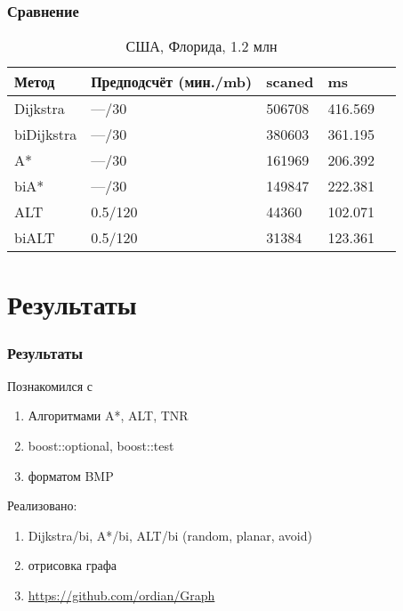\documentclass{beamer}
\begin{document}

\begin{frame}
\frametitle{Сравнение}
\begin{table}
\begin{tabular}{l l l l l}
\toprule
\textbf{Метод} & \textbf{Предподсчёт (мин./mb)} & \textbf{scaned} 
& \textbf{ms}\\
\midrule
Dijkstra    & ---/30  & 506708 & 416.569\\
biDijkstra  & ---/30  & 380603 & 361.195\\
A*          & ---/30  & 161969 & 206.392\\
biA*        & ---/30  & 149847 & 222.381\\
ALT         & 0.5/120  &  44360 & 102.071\\
biALT       & 0.5/120  &  31384 & 123.361\\
\bottomrule
\end{tabular}
\caption{США, Флорида, 1.2 млн}
\end{table}
\end{frame}



\section{Результаты}

\begin{frame}
\frametitle{Результаты}
Познакомился с 
\begin{enumerate}
\item Алгоритмами A*, ALT, TNR
\item boost::optional, boost::test
\item форматом BMP 
\end{enumerate}
Реализовано:
\begin{enumerate}
\item Dijkstra/bi, A*/bi, ALT/bi (random, planar, avoid)
\item отрисовка графа
\item \url{https://github.com/ordian/Graph}
\end{enumerate}
\end{frame}


\end{document}
